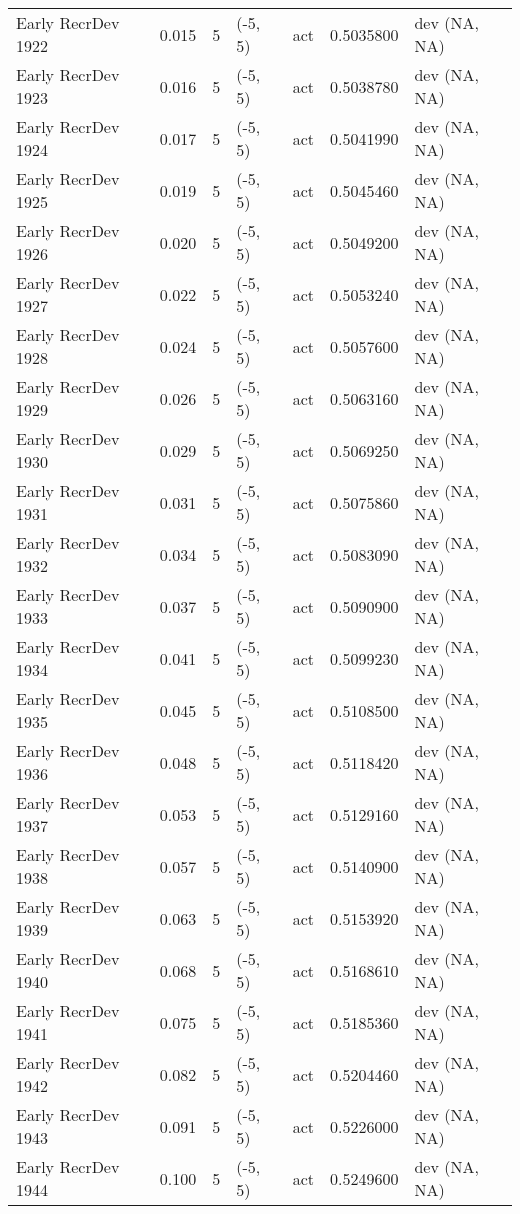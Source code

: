 \documentclass[11pt,
  english,
  letterpaper,
]{article}
\begin{document}
\begin{landscape}
\begin{longtable}[t]{>{\raggedright\arraybackslash}p{7cm}lllll>{\raggedright\arraybackslash}p{4cm}}
Early RecrDev 1922 & 0.015 & 5 & (-5, 5) & act & 0.5035800 & dev (NA, NA)\\
Early RecrDev 1923 & 0.016 & 5 & (-5, 5) & act & 0.5038780 & dev (NA, NA)\\
Early RecrDev 1924 & 0.017 & 5 & (-5, 5) & act & 0.5041990 & dev (NA, NA)\\
Early RecrDev 1925 & 0.019 & 5 & (-5, 5) & act & 0.5045460 & dev (NA, NA)\\
Early RecrDev 1926 & 0.020 & 5 & (-5, 5) & act & 0.5049200 & dev (NA, NA)\\
Early RecrDev 1927 & 0.022 & 5 & (-5, 5) & act & 0.5053240 & dev (NA, NA)\\
Early RecrDev 1928 & 0.024 & 5 & (-5, 5) & act & 0.5057600 & dev (NA, NA)\\
Early RecrDev 1929 & 0.026 & 5 & (-5, 5) & act & 0.5063160 & dev (NA, NA)\\
Early RecrDev 1930 & 0.029 & 5 & (-5, 5) & act & 0.5069250 & dev (NA, NA)\\
Early RecrDev 1931 & 0.031 & 5 & (-5, 5) & act & 0.5075860 & dev (NA, NA)\\
Early RecrDev 1932 & 0.034 & 5 & (-5, 5) & act & 0.5083090 & dev (NA, NA)\\
Early RecrDev 1933 & 0.037 & 5 & (-5, 5) & act & 0.5090900 & dev (NA, NA)\\
Early RecrDev 1934 & 0.041 & 5 & (-5, 5) & act & 0.5099230 & dev (NA, NA)\\
Early RecrDev 1935 & 0.045 & 5 & (-5, 5) & act & 0.5108500 & dev (NA, NA)\\
Early RecrDev 1936 & 0.048 & 5 & (-5, 5) & act & 0.5118420 & dev (NA, NA)\\
Early RecrDev 1937 & 0.053 & 5 & (-5, 5) & act & 0.5129160 & dev (NA, NA)\\
Early RecrDev 1938 & 0.057 & 5 & (-5, 5) & act & 0.5140900 & dev (NA, NA)\\
Early RecrDev 1939 & 0.063 & 5 & (-5, 5) & act & 0.5153920 & dev (NA, NA)\\
Early RecrDev 1940 & 0.068 & 5 & (-5, 5) & act & 0.5168610 & dev (NA, NA)\\
Early RecrDev 1941 & 0.075 & 5 & (-5, 5) & act & 0.5185360 & dev (NA, NA)\\
Early RecrDev 1942 & 0.082 & 5 & (-5, 5) & act & 0.5204460 & dev (NA, NA)\\
Early RecrDev 1943 & 0.091 & 5 & (-5, 5) & act & 0.5226000 & dev (NA, NA)\\
Early RecrDev 1944 & 0.100 & 5 & (-5, 5) & act & 0.5249600 & dev (NA, NA)\\

\end{longtable}
\end{landscape}
\end{document}
